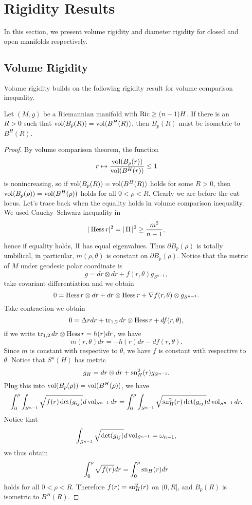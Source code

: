 \section{Rigidity Results}

In this section, we present volume rigidity and diameter rigidity for closed and open manifolds respectively.

\subsection{Volume Rigidity}

Volume rigidity builds on the following rigidity result for volume comparison inequality.
\begin{prop}\label{prop:volume rigidity}
    Let $(M,g)$ be a Riemannian manifold with $\operatorname{Ric}\geq(n-1)H$.
    If there is an $R>0$ such that $\operatorname{vol}(B_p(R))=\operatorname{vol}(B^H(R))$, then $B_p(R)$ must be isometric to $B^H(R)$.
\end{prop}
\begin{proof}
    By volume comparison theorem, the function
    \[r\mapsto\frac{\operatorname{vol}(B_p(r))}{\operatorname{vol}(B^H(r))}\leq 1\]
    is nonincreasing, so if $\operatorname{vol}(B_p(R))=\operatorname{vol}(B^H(R))$ holds for some $R>0$, then $\operatorname{vol}(B_p(\rho))=\operatorname{vol}(B^H(\rho))$ holds for all $0<\rho<R$.
    Clearly we are before the cut locus.
    Let's trace back when the equality holds in volume comparison inequality.
    We used Cauchy--Schwarz inequality in
    \[|\operatorname{Hess}{r}|^2=|\operatorname{II}|^2\geq\frac{m^2}{n-1},\]
    hence if equality holds, $\operatorname{II}$ has equal eigenvalues.
    Thus $\partial B_p(\rho)$ is totally umbilical, in particular, $m(\rho,\theta)$ is constant on $\partial B_p(\rho)$.
    Notice that the metric of $M$ under geodesic polar coordinate is
    \[g=dr\otimes dr+f(r,\theta)g_{S^{n-1}},\]
    take covariant differentiation and we obtain
    \[0=\operatorname{Hess}{r}\otimes dr+dr\otimes\operatorname{Hess}{r}+\nabla f(r,\theta)\otimes g_{S^{n-1}}.\]
    Take contraction we obtain
    \[0=\Delta rdr+\operatorname{tr}_{1,2}dr\otimes\operatorname{Hess}{r}+df(r,\theta),\]
    if we write $\operatorname{tr}_{1,2}dr\otimes\operatorname{Hess}{r}=h(r)dr$, we have
    \[m(r,\theta)dr=-h(r)dr-df(r,\theta).\]
    Since $m$ is constant with respective to $\theta$, we have $f$ is constant with respective to $\theta$.
    Notice that $S^n(H)$ has metric
    \[g_H=dr\otimes dr+\operatorname{sn}^2_H(r)g_{S^{n-1}}.\]
    Plug this into $\operatorname{vol}(B_p(\rho))=\operatorname{vol}(B^H(\rho))$, we have
    \[\int_0^\rho\int_{S^{n-1}}\sqrt{f(r)\det(g_{ij})}d\operatorname{vol}_{S^{n-1}}dr=\int_0^\rho\int_{S^{n-1}}\sqrt{\operatorname{sn}^2_H(r)\det(g_{ij})}d\operatorname{vol}_{S^{n-1}}dr.\]
    Notice that
    \[\int_{S^{n-1}}\sqrt{\det(g_{ij})}d\operatorname{vol}_{S^{n-1}}=\omega_{n-1},\]
    we thus obtain
    \[\int_0^\rho\sqrt{f(r)}dr=\int_0^\rho{\operatorname{sn}_H(r)}dr\]
    holds for all $0<\rho<R$.
    Therefore $f(r)=\operatorname{sn}^2_H(r)$ on $(0,R]$, and $B_p(R)$ is isometric to $B^H(R)$.
\end{proof}

